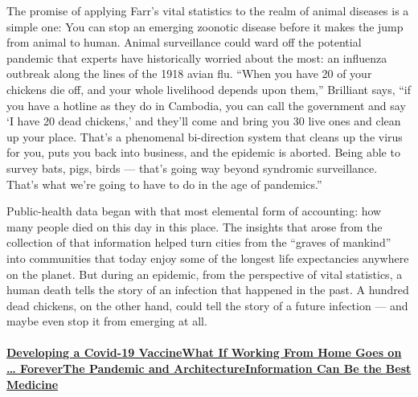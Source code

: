 The promise of applying Farr's vital statistics to the realm of animal
diseases is a simple one: You can stop an emerging zoonotic disease
before it makes the jump from animal to human. Animal surveillance could
ward off the potential pandemic that experts have historically worried
about the most: an influenza outbreak along the lines of the 1918 avian
flu. ``When you have 20 of your chickens die off, and your whole
livelihood depends upon them,'' Brilliant says, ``if you have a hotline
as they do in Cambodia, you can call the government and say `I have 20
dead chickens,' and they'll come and bring you 30 live ones and clean up
your place. That's a phenomenal bi-direction system that cleans up the
virus for you, puts you back into business, and the epidemic is aborted.
Being able to survey bats, pigs, birds --- that's going way beyond
syndromic surveillance. That's what we're going to have to do in the age
of pandemics.''

Public-health data began with that most elemental form of accounting:
how many people died on this day in this place. The insights that arose
from the collection of that information helped turn cities from the
``graves of mankind'' into communities that today enjoy some of the
longest life expectancies anywhere on the planet. But during an
epidemic, from the perspective of vital statistics, a human death tells
the story of an infection that happened in the past. A hundred dead
chickens, on the other hand, could tell the story of a future infection
--- and maybe even stop it from emerging at all.

\hypertarget{developing-a-covid-19-vaccinewhat-if-working-from-home-goes-on--foreverthe-pandemic-and-architectureinformation-can-be-the-best-medicine}{%
\paragraph{\texorpdfstring{\href{https://www.nytimes3xbfgragh.onion/interactive/2020/06/09/magazine/covid-vaccine.html}{Developing
a Covid-19
Vaccine}\href{https://www.nytimes3xbfgragh.onion/interactive/2020/06/09/magazine/remote-work-covid.html}{What
If Working From Home Goes on \ldots{}
Forever}\href{https://www.nytimes3xbfgragh.onion/interactive/2020/06/09/magazine/architecture-covid.html}{The
Pandemic and
Architecture}\href{https://www.nytimes3xbfgragh.onion/interactive/2020/06/10/magazine/covid-data.html}{Information
Can Be the Best
Medicine}}{Developing a Covid-19 VaccineWhat If Working From Home Goes on \ldots{} ForeverThe Pandemic and ArchitectureInformation Can Be the Best Medicine}}\label{developing-a-covid-19-vaccinewhat-if-working-from-home-goes-on--foreverthe-pandemic-and-architectureinformation-can-be-the-best-medicine}}

